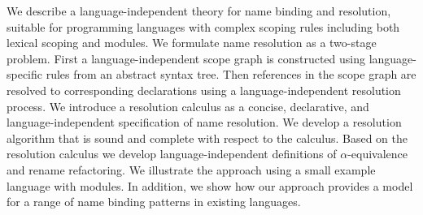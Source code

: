 We describe a language-independent theory for name binding and resolution,
suitable for programming languages with complex scoping rules including both
lexical scoping and modules. We formulate name resolution as a two-stage
problem. First a language-independent scope graph is constructed using
language-specific rules from an abstract syntax tree. Then references in the
scope graph are resolved to corresponding declarations using a
language-independent resolution process. We introduce a resolution calculus as a
concise, declarative, and language-independent specification of name resolution.
We develop a resolution algorithm that is sound and complete with respect to the
calculus. Based on the resolution calculus we develop language-independent
definitions of $\alpha$-equivalence and rename refactoring. We illustrate the
approach using a small example language with modules. In addition, we show how
our approach provides a model for a range of name binding patterns in existing
languages.
